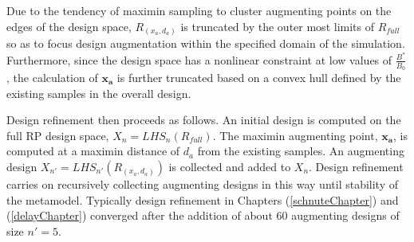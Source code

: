 %
Due to the tendency of maximin sampling to cluster augmenting points on the edges
of the design space, $R_{(x_a, d_a)}$ is truncated by the outer most limits of
$R_{full}$ so as to focus design augmentation within the specified domain of the
simulation. Furthermore, since the design space has a nonlinear constraint at low
values of $\frac{B^*}{B_0}$, the calculation of $\bm{x_a}$ is further truncated
based on a convex hull defined by the existing samples in the overall design.

%
Design refinement then proceeds as follows. An initial design is computed on the 
full RP design space, $X_{n} = LHS_{n}(R_{full})$. %
The maximin augmenting point, $\bm{x_a}$, is computed at a maximin distance of $d_a$ 
from the existing samples. An augmenting design $X_{n'} = LHS_{n'}(R_{(x_a, d_a)})$ 
is collected and added to $X_n$. Design refinement carries on recursively 
collecting augmenting designs in this way until %
stability of the metamodel. Typically design refinement in Chapters (\ref{schnuteChapter}) 
and (\ref{delayChapter}) converged after the addition of about 60 augmenting designs of size $n'=5$.

